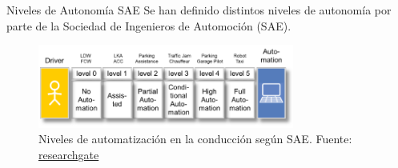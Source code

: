 \documentclass[10pt]{beamer}
\begin{document}
\begin{frame}{Niveles de Autonomía SAE}
    Se han definido distintos niveles de autonomía por parte de la Sociedad de Ingenieros de Automoción (SAE).
    \begin{figure}[!h] 
        \centering
        \includegraphics[width=0.75\textwidth]{../img/levels}
        \caption[Niveles de automatización SAE]{Niveles de automatización en la conducción según SAE. 
        Fuente: \href{https://www.researchgate.net/figure/Terms-related-to-automated-driving-according-to-SAE-and-VDA_fig1_273883061}{researchgate} }
\end{figure}
\end{frame}
\end{document}
